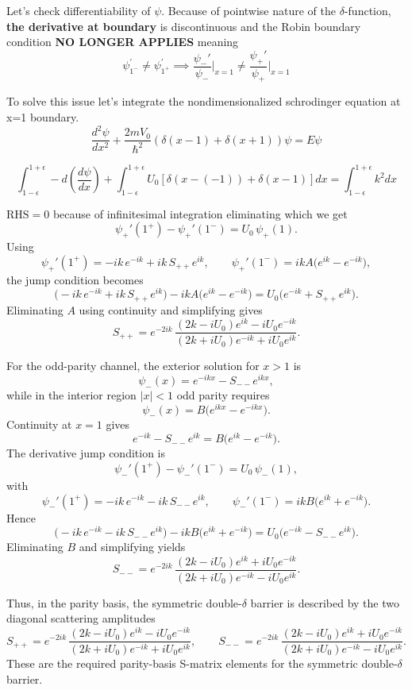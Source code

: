 \documentclass[12pt]{article}
\begin{document}
\begin{enumerate}[label=(\alph*)]
Let's check differentiability of $\psi$. Because of pointwise nature of the \(\delta\)-function, \textbf{the derivative at boundary} is discontinuous and the Robin boundary condition \textbf{NO LONGER APPLIES} meaning \[\psi^{'}_{1^{-}} \neq \psi^{'}_{1^{+}} \implies \frac{\psi_-'}{\psi_-}\Big|_{x=1} \neq \frac{\psi_+'}{\psi_+}\Big|_{x=1}\]

To solve this issue let's integrate the nondimensionalized schrodinger equation at x=1 boundary.
\begin{equation}
\label{eq:'delta-derivative'}
    \dfrac{d^2 \psi}{dx^2} + \dfrac{2m V_0}{\hbar^2}(\delta(x-1) + \delta(x+1))\psi = E\psi
\end{equation}

\[\int_{1-\epsilon}^{1+\epsilon} -d(\dfrac{d \psi}{dx}) + \int_{1-\epsilon}^{1+\epsilon} U_0[\delta(x-(-1)) + \delta(x-1)]dx = \int_{1-\epsilon}^{1+\epsilon}k^2dx \]

$\text{RHS} = 0$ because of infinitesimal integration eliminating which we get
\[
\psi_+'(1^+)-\psi_+'(1^-)=U_0\,\psi_+(1).
\]
Using
\[
\psi_+'(1^+)=-ik\,e^{-ik}+ik\,S_{++}e^{ik},
\qquad
\psi_+'(1^-)=ikA\bigl(e^{ik}-e^{-ik}\bigr),
\]
the jump condition becomes
\[
\bigl(-ik\,e^{-ik}+ik\,S_{++}e^{ik}\bigr)
-
ikA\bigl(e^{ik}-e^{-ik}\bigr)
=
U_0\bigl(e^{-ik}+S_{++}e^{ik}\bigr).
\]
Eliminating \(A\) using continuity and simplifying gives
\[
\boxed{
S_{++}
=
e^{-2ik}\,
\frac{(2k-iU_0)e^{ik}-iU_0e^{-ik}}
{(2k+iU_0)e^{-ik}+iU_0e^{ik}}
}.
\]

For the odd-parity channel, the exterior solution for \(x>1\) is
\[
\psi_-(x)=e^{-ikx}-S_{--}e^{ikx},
\]
while in the interior region \(|x|<1\) odd parity requires
\[
\psi_-(x)=B\bigl(e^{ikx}-e^{-ikx}\bigr).
\]
Continuity at \(x=1\) gives
\[
e^{-ik}-S_{--}e^{ik}=B\bigl(e^{ik}-e^{-ik}\bigr).
\]
The derivative jump condition is
\[
\psi_-'(1^+)-\psi_-'(1^-)=U_0\,\psi_-(1),
\]
with
\[
\psi_-'(1^+)=-ik\,e^{-ik}-ik\,S_{--}e^{ik},
\qquad
\psi_-'(1^-)=ikB\bigl(e^{ik}+e^{-ik}\bigr).
\]
Hence
\[
\bigl(-ik\,e^{-ik}-ik\,S_{--}e^{ik}\bigr)
-
ikB\bigl(e^{ik}+e^{-ik}\bigr)
=
U_0\bigl(e^{-ik}-S_{--}e^{ik}\bigr).
\]
Eliminating \(B\) and simplifying yields
\[
\boxed{
S_{--}
=
e^{-2ik}\,
\frac{(2k-iU_0)e^{ik}+iU_0e^{-ik}}
{(2k+iU_0)e^{-ik}-iU_0e^{ik}}
}.
\]

Thus, in the parity basis, the symmetric double-\(\delta\) barrier is described by the two diagonal scattering amplitudes
\[
\boxed{
S_{++}
=
e^{-2ik}\,
\frac{(2k-iU_0)e^{ik}-iU_0e^{-ik}}
{(2k+iU_0)e^{-ik}+iU_0e^{ik}},
\qquad
S_{--}
=
e^{-2ik}\,
\frac{(2k-iU_0)e^{ik}+iU_0e^{-ik}}
{(2k+iU_0)e^{-ik}-iU_0e^{ik}}
}.
\]
These are the required parity-basis S-matrix elements for the symmetric double-\(\delta\) barrier.


\end{enumerate}
\end{document}
